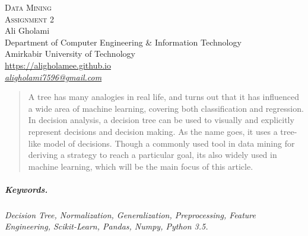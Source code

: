 \documentclass[12pt]{article}
\numberwithin{equation}{section}
\numberwithin{table}{section}
\numberwithin{figure}{section}
\begin{document}

\begin{center}
\textsc{\Huge Data Mining} \\[2pt]
	\textsc{\Large Assignment 2}\\
	\vspace{0.5cm}
  Ali Gholami \\[6pt]
  Department of Computer Engineering \& Information Technology\\
  Amirkabir University of Technology  \\[6pt]
  \def\UrlFont{\em}
  \url{https://aligholamee.github.io}\\
\href{mailto:aligholami7596@gmail.com}{\textit{aligholami7596@gmail.com}}
\end{center}

\begin{abstract}
A tree has many analogies in real life, and turns out that it has influenced a wide area of machine learning, covering both classification and regression. In decision analysis, a decision tree can be used to visually and explicitly represent decisions and decision making. As the name goes, it uses a tree-like model of decisions. Though a commonly used tool in data mining for deriving a strategy to reach a particular goal, its also widely used in machine learning, which will be the main focus of this article.
\end{abstract} 

\subparagraph{Keywords.} \textit{Decision Tree, Normalization, Generalization, Preprocessing, Feature Engineering, Scikit-Learn, Pandas, Numpy, Python 3.5.}
\end{document}
